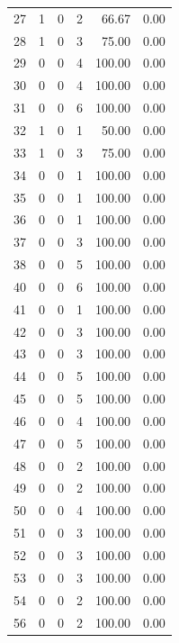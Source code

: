 \documentclass[11pt]{article}
\begin{document}
\begin{longtable}{r|r|r|r|r|r}
    27    & 1     & 0     & 2     & 66.67 & 0.00 \\
    28    & 1     & 0     & 3     & 75.00 & 0.00 \\
    29    & 0     & 0     & 4     & 100.00 & 0.00 \\
    30    & 0     & 0     & 4     & 100.00 & 0.00 \\
    31    & 0     & 0     & 6     & 100.00 & 0.00 \\
    32    & 1     & 0     & 1     & 50.00 & 0.00 \\
    33    & 1     & 0     & 3     & 75.00 & 0.00 \\
    34    & 0     & 0     & 1     & 100.00 & 0.00 \\
    35    & 0     & 0     & 1     & 100.00 & 0.00 \\
    36    & 0     & 0     & 1     & 100.00 & 0.00 \\
    37    & 0     & 0     & 3     & 100.00 & 0.00 \\
    38    & 0     & 0     & 5     & 100.00 & 0.00 \\
    40    & 0     & 0     & 6     & 100.00 & 0.00 \\
    41    & 0     & 0     & 1     & 100.00 & 0.00 \\
    42    & 0     & 0     & 3     & 100.00 & 0.00 \\
    43    & 0     & 0     & 3     & 100.00 & 0.00 \\
    44    & 0     & 0     & 5     & 100.00 & 0.00 \\
    45    & 0     & 0     & 5     & 100.00 & 0.00 \\
    46    & 0     & 0     & 4     & 100.00 & 0.00 \\
    47    & 0     & 0     & 5     & 100.00 & 0.00 \\
    48    & 0     & 0     & 2     & 100.00 & 0.00 \\
    49    & 0     & 0     & 2     & 100.00 & 0.00 \\
    50    & 0     & 0     & 4     & 100.00 & 0.00 \\
    51    & 0     & 0     & 3     & 100.00 & 0.00 \\
    52    & 0     & 0     & 3     & 100.00 & 0.00 \\
    53    & 0     & 0     & 3     & 100.00 & 0.00 \\
    54    & 0     & 0     & 2     & 100.00 & 0.00 \\
    56    & 0     & 0     & 2     & 100.00 & 0.00 \\

\end{longtable}
\end{document}
